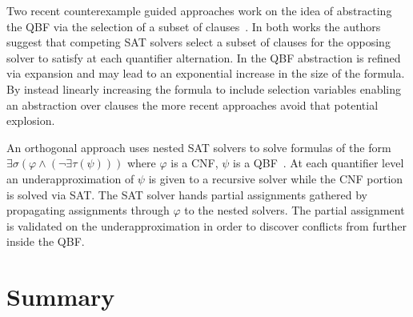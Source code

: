 Two recent counterexample guided approaches work on the idea of abstracting the QBF via the selection of a subset of clauses~\cite{Rabe15,Janota15}. In both works the authors suggest that competing SAT solvers select a subset of clauses for the opposing solver to satisfy at each quantifier alternation. In \cite{Janota12} the QBF abstraction is refined via expansion and may lead to an exponential increase in the size of the formula. By instead linearly increasing the formula to include selection variables enabling an abstraction over clauses the more recent approaches avoid that potential explosion.

An orthogonal approach uses nested SAT solvers to solve formulas of the form $\exists \sigma (\varphi \land (\lnot \exists \tau (\psi)))$ where $\varphi$ is a CNF, $\psi$ is a QBF~\cite{Bogaerts16}. At each quantifier level an underapproximation of $\psi$ is given to a recursive solver while the CNF portion is solved via SAT. The SAT solver hands partial assignments gathered by propagating assignments through $\varphi$ to the nested solvers. The partial assignment is validated on the underapproximation in order to discover conflicts from further inside the QBF. 

\section{Summary}



